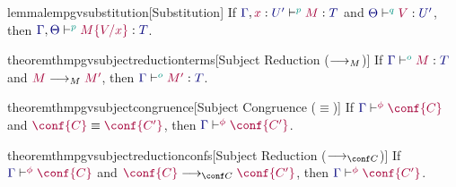 \documentclass[main.tex]{subfiles}
\begin{document}
\begin{restatable}{lemma}{lempgvsubstitution}[Substitution]
  \label{lem:pgv-substitution}
  If $\tseq[\cs{p}]{\ty{\Gamma},\tmty{x}{U'}}{M}{T}$ and $\tseq[\cs{q}]{\ty{\Theta}}{V}{U'}$, then $\tseq[\cs{p}]{\ty{\Gamma},\ty{\Theta}}{\subst{M}{V}{x}}{T}$.
\end{restatable}

\begin{restatable}{theorem}{thmpgvsubjectreductionterms}[Subject Reduction ($\longrightarrow_{M}$)]
  \label{thm:pgv-subject-reduction-terms}
  If $\tseq[\cs{o}]{\ty{\Gamma}}{M}{T}$ and $\tm{M}\tred\tm{M'}$,
  then $\tseq[\cs{o}]{\ty{\Gamma}}{M'}{T}$.
\end{restatable}

\begin{restatable}{theorem}{thmpgvsubjectcongruence}[Subject Congruence ($\equiv$)]
  \label{thm:pgv-subject-congruence}
  If $\cseq[\phi]{\ty{\Gamma}}{\conf{C}}$ and $\tm{\conf{C}}\equiv\tm{\conf{C'}}$,
  then $\cseq[\phi]{\ty{\Gamma}}{\conf{C'}}$.
\end{restatable}

\begin{restatable}{theorem}{thmpgvsubjectreductionconfs}[Subject Reduction ($\cred$)]
  \label{thm:pgv-subject-reduction-confs}
  If $\cseq[\phi]{\ty{\Gamma}}{\conf{C}}$ and $\tm{\conf{C}}\cred\tm{\conf{C'}}$,
  then $\cseq[\phi]{\ty{\Gamma}}{\conf{C'}}$.
\end{restatable}
\end{document}
